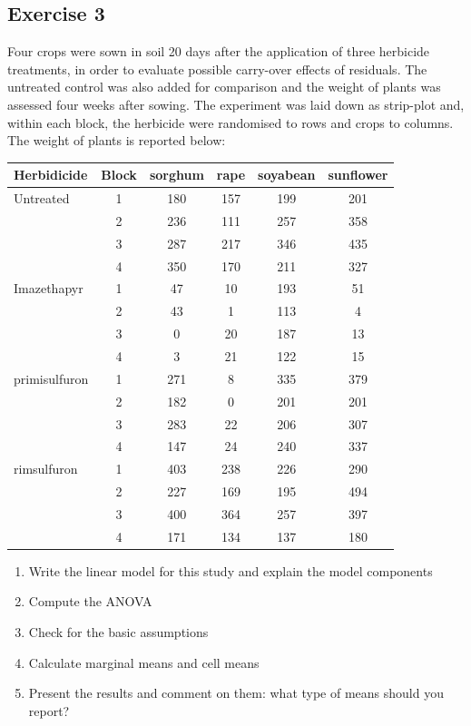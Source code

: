 \documentclass[a4paper,12pt,oneside]{book}
\providecommand{\tightlist}{%
  \setlength{\itemsep}{0pt}\setlength{\parskip}{0pt}}
\begin{document}
\hypertarget{exercise-3-6}{%
\subsection{Exercise 3}\label{exercise-3-6}}

Four crops were sown in soil 20 days after the application of three herbicide treatments, in order to evaluate possible carry-over effects of residuals. The untreated control was also added for comparison and the weight of plants was assessed four weeks after sowing. The experiment was laid down as strip-plot and, within each block, the herbicide were randomised to rows and crops to columns. The weight of plants is reported below:

\begin{longtable}[]{@{}lccccc@{}}
\toprule
Herbidicide & Block & sorghum & rape & soyabean & sunflower \\
\midrule
\endhead
Untreated & 1 & 180 & 157 & 199 & 201 \\
& 2 & 236 & 111 & 257 & 358 \\
& 3 & 287 & 217 & 346 & 435 \\
& 4 & 350 & 170 & 211 & 327 \\
Imazethapyr & 1 & 47 & 10 & 193 & 51 \\
& 2 & 43 & 1 & 113 & 4 \\
& 3 & 0 & 20 & 187 & 13 \\
& 4 & 3 & 21 & 122 & 15 \\
primisulfuron & 1 & 271 & 8 & 335 & 379 \\
& 2 & 182 & 0 & 201 & 201 \\
& 3 & 283 & 22 & 206 & 307 \\
& 4 & 147 & 24 & 240 & 337 \\
rimsulfuron & 1 & 403 & 238 & 226 & 290 \\
& 2 & 227 & 169 & 195 & 494 \\
& 3 & 400 & 364 & 257 & 397 \\
& 4 & 171 & 134 & 137 & 180 \\
\bottomrule
\end{longtable}

\begin{enumerate}
\def\labelenumi{\arabic{enumi}.}
\tightlist
\item
  Write the linear model for this study and explain the model components
\item
  Compute the ANOVA
\item
  Check for the basic assumptions
\item
  Calculate marginal means and cell means
\item
  Present the results and comment on them: what type of means should you report?
\end{enumerate}
\end{document}
